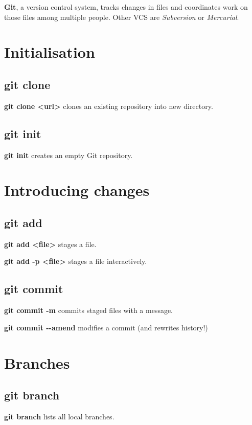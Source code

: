\documentclass{programmingnotes}
\begin{document}
\renewcommand{\footrulewidth}{0.4pt}

\begin{multicols*}{3}
\textbf{Git}, a version control system, tracks changes in files and coordinates work on those files among multiple people.
Other VCS are \emph{Subversion} or \emph{Mercurial}.

\section*{Initialisation} 
\subsection*{\dotfill git clone}
\textbf{git clone <url>} clones an existing repository into new directory.

\subsection*{\dotfill git init}
\textbf{git init} creates an empty Git repository.

\section*{Introducing changes} 
\subsection*{\dotfill git add}
\textbf{git add <file>} stages a file.

\textbf{git add -p <file>} stages a file interactively.

\subsection*{\dotfill git commit}
\textbf{git commit -m} commits staged files with a message.

\textbf{git commit -{}-amend} modifies a commit (and rewrites history!)

\section*{Branches}
\subsection*{\dotfill git branch}
\textbf{git branch}	lists all local branches.


\end{multicols*}
\end{document}
